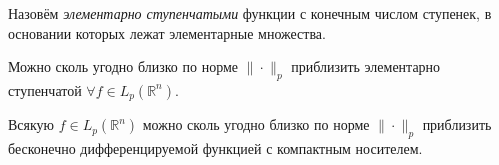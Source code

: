 \begin{to_def}
    Назовём \textit{элементарно ступенчатыми} функции с конечным числом ступенек, в основании которых лежат элементарные множества.
\end{to_def}

\begin{to_thr}[]
     Можно сколь угодно близко по норме $\| \cdot \|_p$ приблизить элементарно ступенчатой $\forall f \in L_p(\mathbb{R}^n)$.
\end{to_thr}

\begin{to_thr}
    Всякую $f \in L_p (\mathbb{R}^n)$ можно сколь угодно близко по норме $\| \cdot \|_p$ приблизить бесконечно дифференцируемой функцией с компактным носителем.
\end{to_thr}

